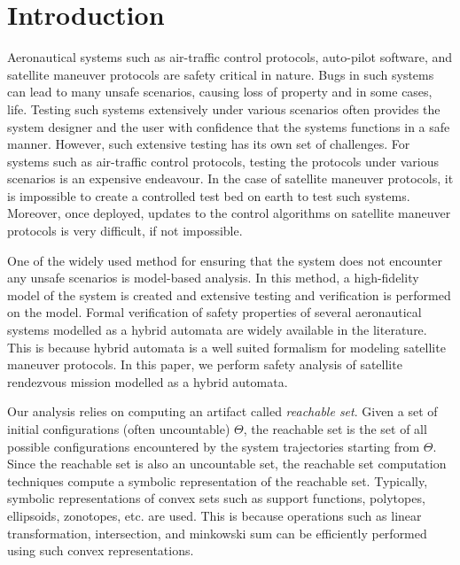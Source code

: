 \section{Introduction}
\label{sec:intro}

Aeronautical systems such as air-traffic control protocols, auto-pilot software, and satellite maneuver protocols are safety critical in nature.
%
Bugs in such systems can lead to many unsafe scenarios, causing loss of property and in some cases, life.
%
Testing such systems extensively under various scenarios often provides the system designer and the user with confidence that the systems functions in a safe manner.
%
However, such extensive testing has its own set of challenges.
%
For systems such as air-traffic control protocols, testing the protocols under various scenarios is an expensive endeavour.
%
In the case of satellite maneuver protocols, it is impossible to create a controlled test bed on earth to test such systems.
%
Moreover, once deployed, updates to the control algorithms on satellite maneuver protocols is very difficult, if not impossible.


One of the widely used method for ensuring that the system does not encounter any unsafe scenarios is model-based analysis.
%
In this method, a high-fidelity model of the system is created and extensive testing and verification is performed on the model.
%
%
% 
% 
Formal verification of safety properties of several aeronautical systems modelled as a hybrid automata are widely available in the literature.
%
This is because hybrid automata is a well suited formalism for modeling satellite maneuver protocols. 
%
%
%
In this paper, we perform safety analysis of satellite rendezvous mission modelled as a hybrid automata.


Our analysis relies on computing an artifact called {\em reachable set}. 
%
Given a set of initial configurations (often uncountable) $\Theta$, the reachable set is the set of all possible configurations encountered by the system trajectories starting from $\Theta$. 
%
Since the reachable set is also an uncountable set, the reachable set computation techniques compute a symbolic representation of the reachable set.
%
Typically, symbolic representations of convex sets such as support functions, polytopes, ellipsoids, zonotopes, etc. are used.
%
This is because operations such as linear transformation, intersection, and minkowski sum can be efficiently performed using such convex representations.


